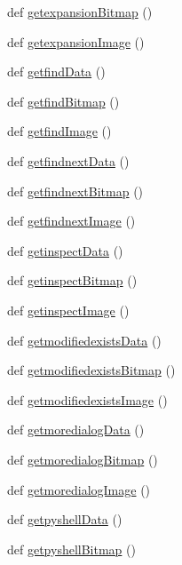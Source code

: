 \begin{DoxyCompactItemize}
\item 
def \hyperlink{namespaceimages_a88a6c64335e300a1b0af78ae78cffb41}{getexpansion\+Bitmap} ()
\item 
def \hyperlink{namespaceimages_aecaae36574467d350121a9514607aaa0}{getexpansion\+Image} ()
\item 
def \hyperlink{namespaceimages_a6a60138ccf8d2891b14779cc5e54c1bd}{getfind\+Data} ()
\item 
def \hyperlink{namespaceimages_ada26a62bbc12c4a9c2f32e893ced1842}{getfind\+Bitmap} ()
\item 
def \hyperlink{namespaceimages_a826840371cb79df70eac1eba3add721d}{getfind\+Image} ()
\item 
def \hyperlink{namespaceimages_abb3065c822065fe636d42835fa80b3b5}{getfindnext\+Data} ()
\item 
def \hyperlink{namespaceimages_a3fda326344336dedf2589b44ed009507}{getfindnext\+Bitmap} ()
\item 
def \hyperlink{namespaceimages_a1999c628386d92b6a1b50f61cfe4e534}{getfindnext\+Image} ()
\item 
def \hyperlink{namespaceimages_aa0295fd7df9df8a8c36dbf45957ebe34}{getinspect\+Data} ()
\item 
def \hyperlink{namespaceimages_a3b8808244fec6d009105a9172e9dce7a}{getinspect\+Bitmap} ()
\item 
def \hyperlink{namespaceimages_a94ab13bbfd0d57bd0543469f7f8a003f}{getinspect\+Image} ()
\item 
def \hyperlink{namespaceimages_aea5b717eed65e55064d892d751ee42a9}{getmodifiedexists\+Data} ()
\item 
def \hyperlink{namespaceimages_afba6dcd82696865e7718eb113495e9f5}{getmodifiedexists\+Bitmap} ()
\item 
def \hyperlink{namespaceimages_ae65babb8d1bc2e6da9a094b09555867c}{getmodifiedexists\+Image} ()
\item 
def \hyperlink{namespaceimages_a78cb338a47bd555e7036963d52cd7412}{getmoredialog\+Data} ()
\item 
def \hyperlink{namespaceimages_add10ebe4b5b0704d2b1672509e931db3}{getmoredialog\+Bitmap} ()
\item 
def \hyperlink{namespaceimages_a6470d924bdc02d97c2371afebd4c5d62}{getmoredialog\+Image} ()
\item 
def \hyperlink{namespaceimages_a93fd0751fa8042ffd073aea24eb2dec0}{getpyshell\+Data} ()
\item 
def \hyperlink{namespaceimages_a09ec6a51e2a48611d87400f71f606d42}{getpyshell\+Bitmap} ()
\item 

\end{DoxyCompactItemize}
